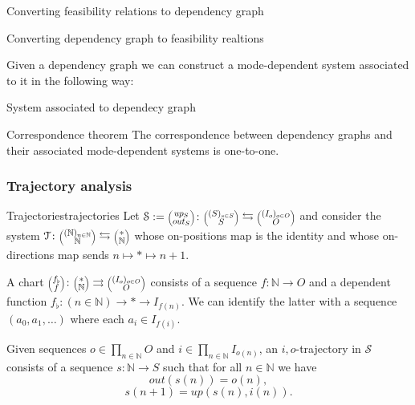 \documentclass[12pt, a4paper]{article}
\theoremstyle{definition}
\theoremstyle{plain}
\theoremstyle{plain}
\theoremstyle{plain}
\theoremstyle{plain}
\theoremstyle{plain}
\theoremstyle{remark}
\theoremstyle{remark}
\newcommand{\mc}[1]{\mathcal{#1}}
\newcommand{\lens}[2]{\scaleobj{0.6}{\begin{pmatrix} \scaleobj{1.3}{{#1}} \\ \scaleobj{1.3}{{#2}} \end{pmatrix}}}
\begin{document}
\begin{tcexample}{Converting feasibility relations to dependency graph}{}

\end{tcexample}

\begin{tcexample}{Converting dependency graph to feasibility realtions}{}

\end{tcexample}

Given a dependency graph we can construct a mode-dependent system associated to it in the following way:
\begin{tcdefinition}{System associated to dependecy graph}{}

\end{tcdefinition}

\begin{tctheorem}{Correspondence theorem}{}
	The correspondence between dependency graphs and their associated mode-dependent systems is one-to-one.
\end{tctheorem}

\subsubsection{Trajectory analysis}

\begin{tcdefinition}{Trajectories}{trajectories}
	Let $\mc{S} := \lens{up_S}{out_S} \colon \lens{(S)_{s \in S}}{S} \leftrightarrows \lens{(I_o)_{o \in O}}{O}$ and consider the system $\mc{T} \colon \lens{(\mathbb{N})_{n \in \mathbb{N}}}{\mathbb{N}} \leftrightarrows \lens{*}{\mathbb{N}}$ whose on-positions map is the identity and whose on-directions map sends $n \mapsto * \mapsto n+1$.

	A chart $\lens{f_\flat}{f} \colon \lens{*}{\mathbb{N}} \rightrightarrows \lens{(I_o)_{o \in O}}{O}$ consists of a sequence $f \colon \mathbb{N} \rightarrow O$ and a dependent function $f_\flat \colon (n \in \mathbb{N}) \rightarrow * \rightarrow I_{f(n)}$. We can identify the latter with a sequence $(a_0, a_1, \ldots)$ where each $a_i \in I_{f(i)}$.

	Given sequences $o \in \prod_{n \in \mathbb{N}} O$ and $i \in \prod_{n \in \mathbb{N}} I_{o(n)}$, an $i,o$-trajectory in $\mc{S}$ consists of a sequence $s \colon \mathbb{N} \rightarrow S$ such that for all $n \in \mathbb{N}$ we have
	$$out(s(n)) = o(n), $$
	$$s(n+1) = up(s(n), i(n)).$$
\end{tcdefinition}
\end{document}
